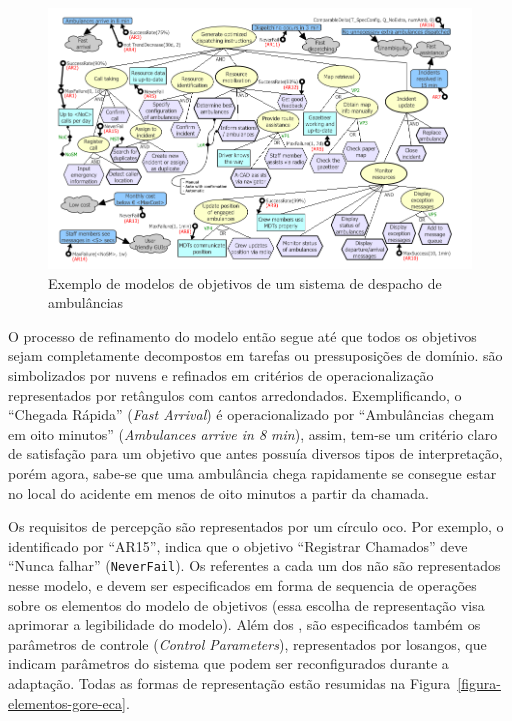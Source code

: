 \begin{figure}[h]
	\centering
	\includegraphics[width=1\textwidth]{figuras/modelos/ACAD-Completo.png}
	\caption{Exemplo de modelos de objetivos de um sistema de despacho de ambulâncias ~\cite{tesevitor}}
	\label{figura-acad-completo}
\end{figure}

O processo de refinamento do modelo então segue até que todos os objetivos sejam completamente decompostos em tarefas ou pressuposições de domínio. \sofgoals são simbolizados por nuvens e refinados em critérios de operacionalização representados por retângulos com cantos arredondados. Exemplificando, o \sofgoal ``Chegada Rápida'' (\textit{Fast Arrival}) é operacionalizado por ``Ambulâncias chegam em oito minutos'' (\textit{Ambulances arrive in 8 min}), assim, tem-se um critério claro de satisfação para um objetivo que antes possuía diversos tipos de interpretação, porém agora, sabe-se que uma ambulância chega rapidamente se consegue estar no local do acidente em menos de oito minutos a partir da chamada.

Os requisitos de percepção são representados por um círculo oco. Por exemplo, o \awreq identificado por ``AR15'', indica que o objetivo ``Registrar Chamados'' deve ``Nunca falhar'' (\texttt{NeverFail}). Os \evoreqs referentes a cada um dos \awreqs não são representados nesse modelo, e devem ser especificados em forma de sequencia de operações sobre os elementos do modelo de objetivos (essa escolha de representação visa aprimorar a legibilidade do modelo). Além dos \awreqs, são especificados também os parâmetros de controle (\textit{Control Parameters}), representados por losangos, que indicam parâmetros do sistema que podem ser reconfigurados durante a adaptação. Todas as formas de representação estão resumidas na Figura~\ref{figura-elementos-gore-eca}.

